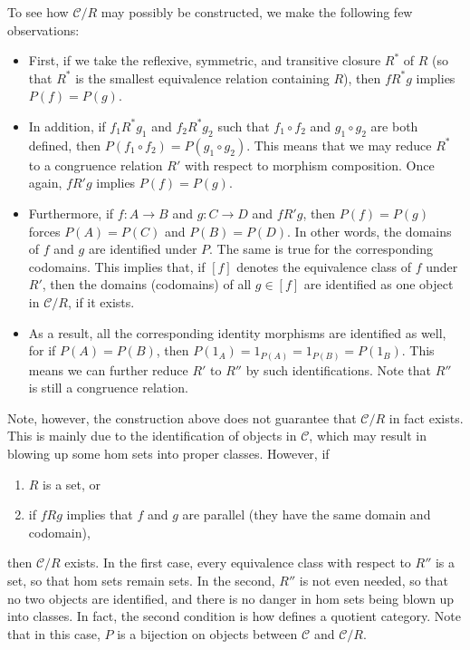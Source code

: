 \documentclass[12pt]{article}
\begin{document}
To see how $\mathcal{C}/R$ may possibly be constructed, we make the following few observations:
\begin{itemize}
\item First, if we take the reflexive, symmetric, and transitive closure $R^*$ of $R$ (so that $R^*$ is the smallest equivalence relation containing $R$), then $f R^* g$ implies $P(f)=P(g)$.  
\item In addition, if $f_1 R^* g_1$ and $f_2 R^* g_2$ such that $f_1 \circ f_2$ and $g_1\circ g_2$ are both defined, then $P(f_1\circ f_2) = P(g_1\circ g_2)$.  This means that we may reduce $R^*$ to a congruence relation $R'$ with respect to morphism composition.  Once again, $f R' g$ implies $P(f)=P(g)$.
\item Furthermore, if $f:A\to B$ and $g:C\to D$ and $f R' g$, then $P(f)=P(g)$ forces $P(A)=P(C)$ and $P(B)=P(D)$.  In other words, the domains of $f$ and $g$ are identified under $P$.  The same is true for the corresponding codomains.  This implies that, if $[f]$ denotes the equivalence class of $f$ under $R'$, then the domains (codomains) of all $g\in [f]$ are identified as one object in $\mathcal{C}/R$, if it exists.  
\item As a result, all the corresponding identity morphisms are identified as well, for if $P(A)=P(B)$, then $P(1_A)=1_{P(A)} = 1_{P(B)}= P(1_B)$.  This means we can further reduce $R'$ to $R''$ by such identifications.  Note that $R''$ is still a congruence relation.
\end{itemize}
Note, however, the construction above does not guarantee that $\mathcal{C}/R$ in fact exists.  This is mainly due to the identification of objects in $\mathcal{C}$, which may result in blowing up some hom sets into proper classes.  However, if 
\begin{enumerate}
\item $R$ is a set, or 
\item if $f R g$ implies that $f$ and $g$ are parallel (they have the same domain and codomain), 
\end{enumerate}
then $\mathcal{C}/R$ exists.  In the first case, every equivalence class with respect to $R''$ is a set, so that hom sets remain sets.  In the second, $R''$ is not even needed, so that no two objects are identified, and there is no danger in hom sets being blown up into classes.  In fact, the second condition is how \cite{Ma} defines a quotient category.  Note that in this case, $P$ is a bijection on objects between $\mathcal{C}$ and $\mathcal{C}/R$.
\end{document}
